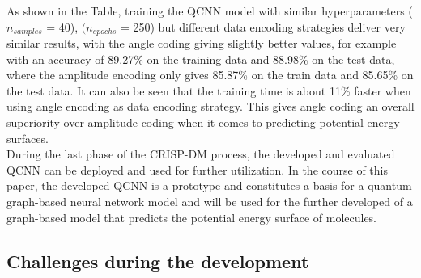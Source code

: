 As shown in the Table, training the QCNN model with similar hyperparameters ($n_{samples}$ = 40), $(n_{epochs}$ = 250) but different data encoding strategies deliver very similar results, with the angle coding giving slightly better values, for example with an accuracy of 89.27\% on the training data and 88.98\% on the test data, where the amplitude encoding only gives 85.87\% on the train data and 85.65\% on the test data. It can also be seen that the training time is about 11\% faster when using angle encoding as data encoding strategy. This gives angle coding an overall superiority over amplitude coding when it comes to predicting potential energy surfaces.\\

During the last phase of the CRISP-DM process, the developed and evaluated QCNN can be deployed and used for further utilization. In the course of this paper, the developed QCNN is a prototype and constitutes a basis for a quantum graph-based neural network model and will be used for the further developed of a graph-based model that predicts the potential energy surface of molecules. 

\subsection{Challenges during the development}

